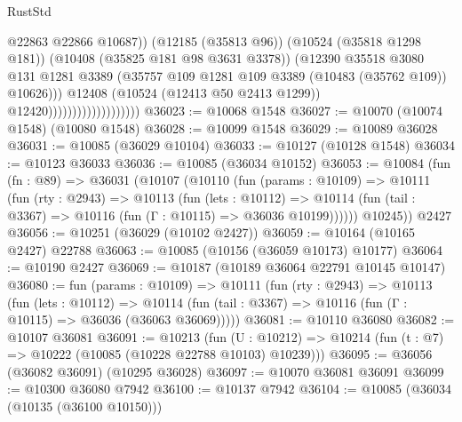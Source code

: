 \begin{lexlean}{RustStd}
\begin{coremodule}
                                                @22863
                                                @22866
                                                @10687))
                                            (@12185 (@35813 @96))
                                            (@10524 (@35818 @1298 @181))
                                            (@10408 (@35825 @181 @98 @3631 @3378))
                                            (@12390
                                              @35518
                                              @3080
                                              @131
                                              @1281
                                              @3389
                                              (@35757
                                                @109
                                                @1281
                                                @109
                                                @3389
                                                (@10483 (@35762 @109))
                                                @10626)))
                                          @12408
                                          (@10524 (@12413 @50 @2413 @1299))
                                          @12420)))))))))))))))))))
@36023 := @10068 @1548
@36027 := @10070 (@10074 @1548) (@10080 @1548)
@36028 := @10099 @1548
@36029 := @10089 @36028
@36031 := @10085 (@36029 @10104)
@36033 := @10127 (@10128 @1548)
@36034 := @10123 @36033
@36036 := @10085 (@36034 @10152)
@36053 := @10084
    (fun (fn : @89) =>
    @36031
      (@10107
        (@10110
          (fun (params : @10109) =>
          @10111
            (fun (rty : @2943) =>
            @10113
              (fun (lets : @10112) =>
              @10114 (fun (tail : @3367) => @10116 (fun (Γ : @10115) => @36036 @10199))))))
        @10245))
    @2427
@36056 := @10251 (@36029 (@10102 @2427))
@36059 := @10164 (@10165 @2427) @22788
@36063 := @10085 (@10156 (@36059 @10173) @10177)
@36064 := @10190 @2427
@36069 := @10187 (@10189 @36064 @22791 @10145 @10147)
@36080 := fun (params : @10109) =>
  @10111
    (fun (rty : @2943) =>
    @10113
      (fun (lets : @10112) =>
      @10114 (fun (tail : @3367) => @10116 (fun (Γ : @10115) => @36036 (@36063 @36069)))))
@36081 := @10110 @36080
@36082 := @10107 @36081
@36091 := @10213
    (fun (U : @10212) => @10214 (fun (t : @7) => @10222 (@10085 (@10228 @22788 @10103) @10239)))
@36095 := @36056 (@36082 @36091) (@10295 @36028)
@36097 := @10070 @36081 @36091
@36099 := @10300 @36080 @7942
@36100 := @10137 @7942
@36104 := @10085 (@36034 (@10135 (@36100 @10150)))

\end{coremodule}
\end{lexlean}
